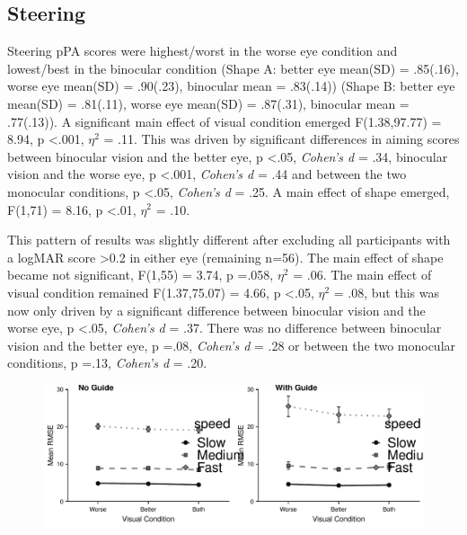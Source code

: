 \documentclass[
  english,
  man,floatsintext]{apa6}
\begin{document}
\hypertarget{steering}{%
\subsection{Steering}\label{steering}}

Steering pPA scores were highest/worst in the worse eye condition and lowest/best in the binocular condition (Shape A: better eye mean(SD) = .85(.16), worse eye mean(SD) = .90(.23), binocular mean = .83(.14)) (Shape B: better eye mean(SD) = .81(.11), worse eye mean(SD) = .87(.31), binocular mean = .77(.13)).
A significant main effect of visual condition emerged F(1.38,97.77) = 8.94, p \textless{}.001, \(\eta^2\) = .11.
This was driven by significant differences in aiming scores between binocular vision and the better eye, p \textless{}.05, \emph{Cohen's d} = .34, binocular vision and the worse eye, p \textless{}.001, \emph{Cohen's d} = .44 and between the two monocular conditions, p \textless{}.05, \emph{Cohen's d} = .25.
A main effect of shape emerged, F(1,71) = 8.16, p \textless{}.01, \(\eta^2\) = .10.

This pattern of results was slightly different after excluding all participants with a logMAR score \textgreater{}0.2 in either eye (remaining n=56).
The main effect of shape became not significant, F(1,55) = 3.74, p =.058, \(\eta^2\) = .06.
The main effect of visual condition remained F(1.37,75.07) = 4.66, p \textless{}.05, \(\eta^2\) = .08, but this was now only driven by a significant difference between binocular vision and the worse eye, p \textless{}.05, \emph{Cohen's d} = .37.
There was no difference between binocular vision and the better eye, p =.08, \emph{Cohen's d} = .28 or between the two monocular conditions, p =.13, \emph{Cohen's d} = .20.

\begin{figure}

{\centering \includegraphics{cataracts_paper_giveup_files/figure-latex/unnamed-chunk-3-1} 

}

\caption{ }\label{fig:unnamed-chunk-3}
\end{figure}
\end{document}
